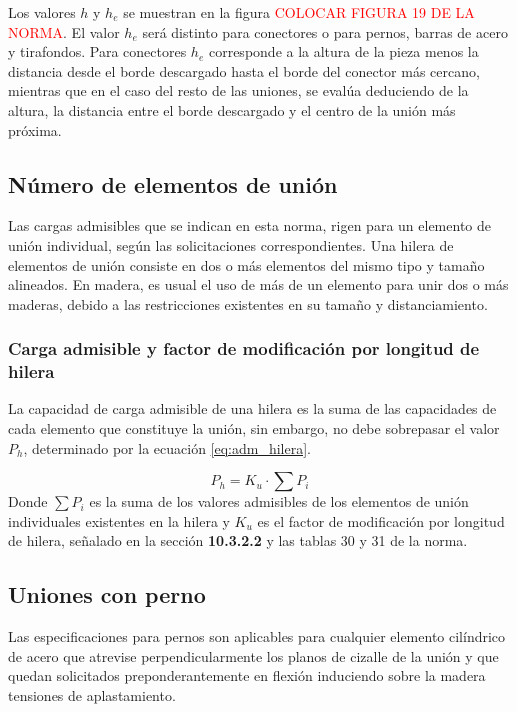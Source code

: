 Los valores $h$ y $h_e$ se muestran en la figura \textcolor{red}{COLOCAR FIGURA 19 DE LA NORMA}. El valor $h_e$ será distinto para conectores o para pernos, barras de acero y tirafondos. Para conectores $h_e$ corresponde a la altura de la pieza menos la distancia desde el borde descargado hasta el borde del conector más cercano, mientras que en el caso del resto de las uniones, se evalúa deduciendo de la altura, la distancia entre el borde descargado y el centro de la unión más próxima.

\subsection{Número de elementos de unión}
Las cargas admisibles que se indican en esta norma, rigen para un elemento de unión individual, según las solicitaciones correspondientes. Una hilera de elementos de unión consiste en dos o más elementos del mismo tipo y tamaño alineados. En madera, es usual el uso de más de un elemento para unir dos o más maderas, debido a las restricciones existentes en su tamaño y distanciamiento.

\subsubsection{Carga admisible y factor de modificación por longitud de hilera}
La capacidad de carga admisible de una hilera es la suma de las capacidades de cada elemento que constituye la unión, sin embargo, no debe sobrepasar el valor $P_h$, determinado por la ecuación \ref{eq:adm_hilera}.

\begin{equation}\label{eq:adm_hilera}
	P_h = K_u \cdot \sum P_i
\end{equation}
Donde $\sum P_i$ es la suma de los valores admisibles de los elementos de unión individuales existentes en la hilera y $K_u$ es el factor de modificación por longitud de hilera, señalado en la sección \textbf{10.3.2.2} y las tablas 30 y 31 de la norma.

\subsection{Uniones con perno}
Las especificaciones para pernos son aplicables para cualquier elemento cilíndrico de acero que atrevise perpendicularmente los planos de cizalle de la unión y que quedan solicitados preponderantemente en flexión induciendo sobre la madera tensiones de aplastamiento.

